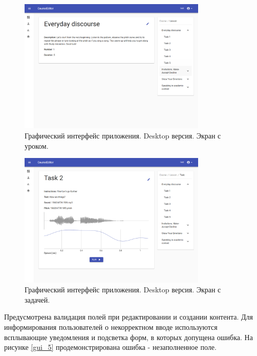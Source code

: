 \documentclass[%
  a5paper,
  subf,
  href,
  master,
  dotsinheaders 
]{csse-fcs}
\begin{document}
\begin{figure}[H]
\includegraphics[width=0.8\textwidth]{img/7.png}
\captionsetup{justification=justified}
\caption{Графический интерфейс приложения. Desktop версия. Экран с уроком.}
\label{gui_3}
\end{figure}

\begin{figure}[H]
\includegraphics[width=0.8\textwidth]{img/8.png}
\captionsetup{justification=justified}
\caption{Графический интерфейс приложения. Desktop версия. Экран с задачей.}
\label{gui_4}
\end{figure}

Предусмотрена валидация полей при редактировании и создании контента.
Для информирования пользователей о некорректном вводе используются всплывающие уведомления и подсветка форм, в которых допущена ошибка.
На рисунке \ref{gui_5} продемонстрирована ошибка - незаполненное поле.
\end{document}
